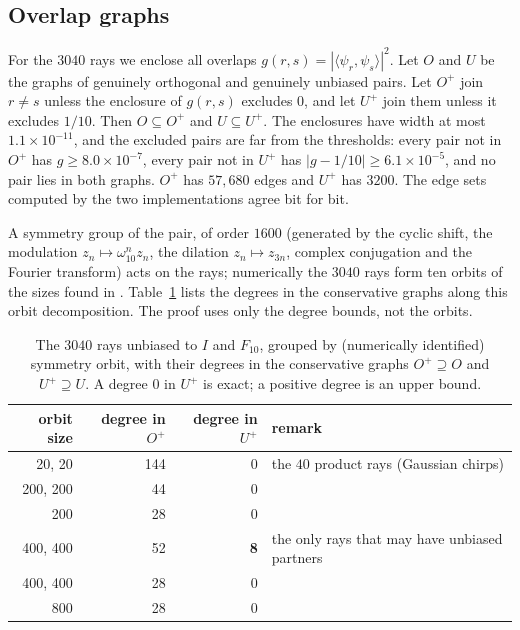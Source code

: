 \documentclass[11pt]{article}
\theoremstyle{definition}
\theoremstyle{remark}
\begin{document}
\subsection{Overlap graphs}
For the $3040$ rays we enclose all overlaps $g(r,s)=|\langle\psi_r,\psi_s\rangle|^2$. Let $O$ and $U$ be the graphs of
genuinely orthogonal and genuinely unbiased pairs. Let $O^+$ join $r\neq s$ unless the enclosure of $g(r,s)$ excludes
$0$, and let $U^+$ join them unless it excludes $1/10$. Then $O\subseteq O^+$ and $U\subseteq U^+$. The enclosures have
width at most $1.1\times10^{-11}$, and the excluded pairs are far from the thresholds: every pair not in $O^+$ has
$g\ge8.0\times10^{-7}$, every pair not in $U^+$ has $|g-1/10|\ge6.1\times10^{-5}$, and no pair lies in both graphs.
$O^+$ has $57{,}680$ edges and $U^+$ has $3200$. The edge sets computed by the two implementations agree bit for bit.

A symmetry group of the pair, of order $1600$ \cite{FuhrRzeszotnik2015} (generated by the cyclic shift, the modulation $z_n\mapsto\omega_{10}^nz_n$, the
dilation $z_n\mapsto z_{3n}$, complex conjugation and the Fourier transform) acts on the rays; numerically the $3040$
rays form ten orbits of the sizes found in \cite{FuhrRzeszotnik2015}. Table~\ref{tab:fourier} lists the degrees in
the conservative graphs along this orbit decomposition. The proof uses only the degree bounds, not the orbits.

\begin{table}[ht]
\centering
\begin{tabular}{rrrl}
\toprule
orbit size & degree in $O^+$ & degree in $U^+$ & remark\\
\midrule
20, 20 & 144 & 0 & the $40$ product rays (Gaussian chirps)\\
200, 200 & 44 & 0 & \\
200 & 28 & 0 & \\
400, 400 & 52 & \textbf{8} & the only rays that may have unbiased partners\\
400, 400 & 28 & 0 & \\
800 & 28 & 0 & \\
\bottomrule
\end{tabular}
\caption{The $3040$ rays unbiased to $I$ and $F_{10}$, grouped by (numerically identified) symmetry orbit, with their
degrees in the conservative graphs $O^+\supseteq O$ and $U^+\supseteq U$. A degree $0$ in $U^+$ is exact; a positive
degree is an upper bound.}
\label{tab:fourier}
\end{table}
\end{document}
